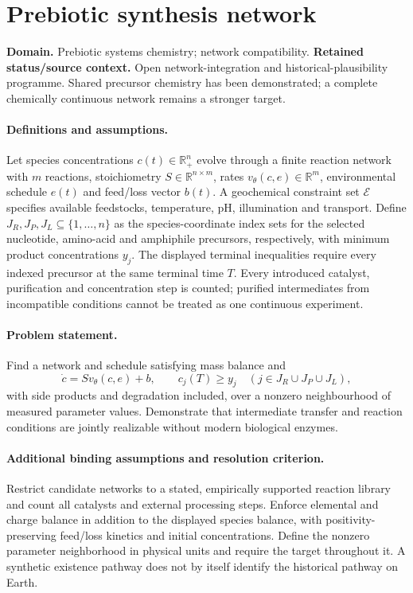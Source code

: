 \documentclass[11pt]{article}
\begin{document}
\section*{Prebiotic synthesis network}
\label{prob:282}
\label{rank:188}
\par\smallskip

\noindent\textbf{Domain.} Prebiotic systems chemistry; network compatibility. \quad \textbf{Retained status/source context.} Open network-integration and historical-plausibility programme. Shared precursor chemistry has been demonstrated; a complete chemically continuous network remains a stronger target.

\paragraph{Definitions and assumptions.} Let species concentrations $c(t)\in\mathbb{R}_+^n$ evolve through a finite reaction network with $m$ reactions, stoichiometry $S\in\mathbb{R}^{n\times m}$, rates $v_\theta(c,e)\in\mathbb{R}^m$, environmental schedule $e(t)$ and feed/loss vector $b(t)$. A geochemical constraint set $\mathcal E$ specifies available feedstocks, temperature, pH, illumination and transport. Define $J_R,J_P,J_L\subseteq\{1,\ldots,n\}$ as the species-coordinate index sets for the selected nucleotide, amino-acid and amphiphile precursors, respectively, with minimum product concentrations $y_j$. The displayed terminal inequalities require every indexed precursor at the same terminal time $T$. Every introduced catalyst, purification and concentration step is counted; purified intermediates from incompatible conditions cannot be treated as one continuous experiment.

\paragraph{Problem statement.} Find a network and schedule satisfying mass balance and
\[
\dot c=Sv_\theta(c,e)+b,
\qquad c_j(T)\geq y_j\quad(j\in J_R\cup J_P\cup J_L),
\]
with side products and degradation included, over a nonzero neighbourhood of measured parameter values. Demonstrate that intermediate transfer and reaction conditions are jointly realizable without modern biological enzymes.

\paragraph{Additional binding assumptions and resolution criterion.} Restrict candidate networks to a stated, empirically supported reaction library and count all catalysts and external processing steps. Enforce elemental and charge balance in addition to the displayed species balance, with positivity-preserving feed/loss kinetics and initial concentrations. Define the nonzero parameter neighborhood in physical units and require the target throughout it. A synthetic existence pathway does not by itself identify the historical pathway on Earth.
\end{document}
